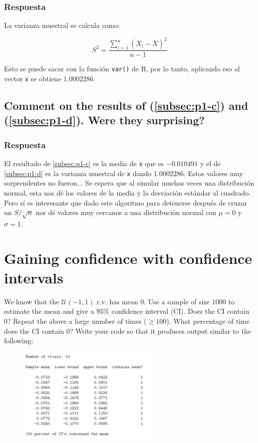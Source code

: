 \documentclass[12pt]{article}\usepackage[]{graphicx}\usepackage[]{xcolor}
\begin{document}
\subsubsection{Respuesta}

La varianza muestral se calcula como:

\[
S^{2} = \frac{\sum_{i=1}^{n} (X_{i} - \bar{X})^{2}}{n-1}
\]

Esto se puede sacar con la función \lstinline|var()| de \textsf{R}, por lo tanto, aplicando eso al vector \lstinline|x| se obtiene $1.0002286$.



\subsection{Comment on the results of (\ref{subsec:p1-c}) and (\ref{subsec:p1-d}). Were they surprising?}
\label{subsec:p1-e}

\subsubsection{Respuesta}

El resultado de \ref{subsec:p1-c} es la media de \lstinline|x| que es $-0.010491$ y el de \ref{subsec:p1-d} es la varianza muestral de \lstinline|x| dando $1.0002286$. Estos valores muy sorprendentes no fueron... Se espera que al simular muchas veces una distribución normal, esta nos dé los valores de la media y la desviación estándar al cuadrado. Pero sí es interesante que dado este algoritmo para detenerse después de cruzar un $S / \sqrt{n}$ nos dé valores muy cercanos a una distribución normal con $\mu = 0$ y $\sigma = 1$.


\newpage

\section{Gaining confidence with confidence intervals}

We know that the $\mathcal{U}(-1, 1)$ r.v. has mean 0. Use a sample of size $1000$ to estimate the mean and give a $95\%$ confidence interval (CI). Does the CI contain 0? Repeat the above a large number of times ($\geq  100$). What percentage of time does the CI contain 0? Write your code so that it produces output similar to the following:

\begin{figure}[ht]
  \centering
  \includegraphics[width=0.6\textwidth]{img/Punto2.png}
\end{figure}
\end{document}
